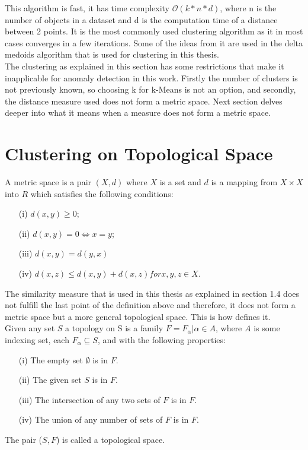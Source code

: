 \documentclass[thesis=B,english]{FITthesis}[2012/10/20]
\begin{document}
This algorithm is fast, it has time complexity $\mathcal{O}(k*n*d)$, where n is the number of objects in a dataset and d is the computation time of a distance between 2 points.
It is the most commonly used clustering algorithm as it in most cases converges in a few iterations.
Some of the ideas from it are used in the delta medoids algorithm that is used for clustering in this thesis. \\

The clustering as explained in this section has some restrictions that make it inapplicable for anomaly detection in this work.
Firstly the number of clusters is not previously known, so choosing k for k-Means is not an option, and secondly, the distance measure used does not form a metric space.
Next section delves deeper into what it means when a measure does not form a metric space.

\section{Clustering on Topological Space}

A metric space is a pair $(X, d)$ where $X$ is a set and $d$ is a mapping from $X \times X$ into $R$ which satisfies the following conditions:
\begin{enumerate}
    \item [(i)] $d(x, y) \geq 0$;
    \item [(ii)] $d(x, y) = 0 \iff x = y$;
    \item [(iii)] $d(x, y) = d(y, x)$
    \item [(iv)] $d(x, z) \leq d(x, y) + d(x, z) for x, y, z \in X$.
\end{enumerate}

The similarity measure that is used in this thesis as explained in section 1.4  does not fulfill the last point of the definition above and therefore, it does not form a metric space but a more general topological space. This is how \cite{stahl2014introduction} defines it. \\

Given any set $S$ a topology on S is a family $F ={F_{\alpha} | \alpha \in A}$, where $A$ is some indexing set, each $F_{\alpha}  \subseteq S$, and with the following properties:
\begin{enumerate}
    \item [(i)] The empty set $\emptyset$ is in $F$.
    \item [(ii)] The given set $S$ is in $F$.
    \item [(iii)] The intersection of any two sets of $F$ is in $F$.
    \item [(iv)] The union of any number of sets of $F$ is in $F$.
\end{enumerate}
The pair ($S, F$) is called a topological space. \\
\end{document}
